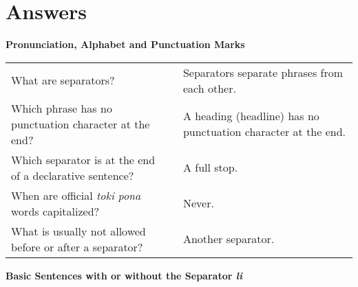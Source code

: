 \section{Answers}

\textbf{Pronunciation, Alphabet and Punctuation Marks} 
\label{'pronunciation_alphabet'}

\begin{supertabular}{p{5,5cm}|ll}
What are separators? && Separators separate phrases from each other.  \\ %
Which phrase has no punctuation character at the end? && A heading (headline) has no punctuation character at the end. \\ %
Which separator is at the end of a declarative sentence? && A full stop. \\ %
When are official \textit{toki pona} words capitalized? && Never. \\ %
What is usually not allowed before or after a separator? && Another separator. \\ %
\end{supertabular} 

\textbf{Basic Sentences with or without the Separator \textit{li}} 
\label{'basic_sentences'}

